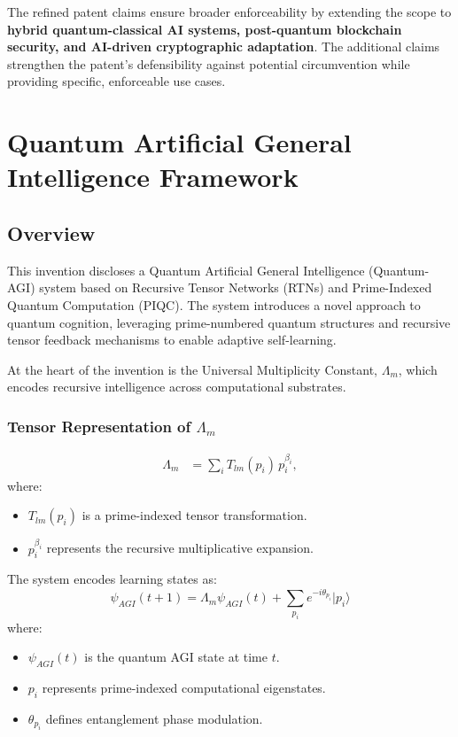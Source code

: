 \documentclass{article}
\theoremstyle{plain}
\begin{document}
The refined patent claims ensure broader enforceability by extending the scope to \textbf{hybrid quantum-classical AI systems, post-quantum blockchain security, and AI-driven cryptographic adaptation}. The additional claims strengthen the patent’s defensibility against potential circumvention while providing specific, enforceable use cases.

\section{Quantum Artificial General Intelligence Framework}

\subsection{Overview}
This invention discloses a Quantum Artificial General Intelligence (Quantum-AGI) system based on Recursive Tensor Networks (RTNs) and Prime-Indexed Quantum Computation (PIQC). The system introduces a novel approach to quantum cognition, leveraging prime-numbered quantum structures and recursive tensor feedback mechanisms to enable adaptive self-learning.

At the heart of the invention is the Universal Multiplicity Constant, $\Lambda_m$, which encodes recursive intelligence across computational substrates.

\subsubsection{Tensor Representation of $\Lambda_m$}
\begin{align}
\Lambda_m &= \sum_{i} T_{lm}(p_i)\, p_i^{\beta_i},
\end{align}
where:
\begin{itemize}
    \item $T_{lm}(p_i)$ is a prime-indexed tensor transformation.
    \item $p_i^{\beta_i}$ represents the recursive multiplicative expansion.
\end{itemize}
The system encodes learning states as:
\begin{equation}
    \psi_{AGI}(t+1) = \Lambda_m \psi_{AGI}(t) + \sum_{p_i} e^{-i \theta_{p_i}} |p_i \rangle
\end{equation}
where:
\begin{itemize}
    \item $\psi_{AGI}(t)$ is the quantum AGI state at time $t$.
    \item $p_i$ represents prime-indexed computational eigenstates.
    \item $\theta_{p_i}$ defines entanglement phase modulation.
\end{itemize}
\end{document}
